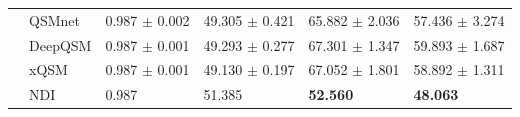 \documentclass[sn-vancouver,Numbered]{sn-jnl}%
\begin{document}
\begin{table}[htbp]
{\begin{tabular}{clllll}
& QSMnet                
&0.987 $\pm$ 0.002  
&49.305 $\pm$ 0.421
&65.882 $\pm$ 2.036
&57.436 $\pm$ 3.274\\  

& DeepQSM               
&0.987 $\pm$ 0.001	            
&49.293 $\pm$ 0.277	                
&67.301 $\pm$ 1.347	              
&59.893 $\pm$ 1.687\\ 

& xQSM               
&0.987 $\pm$ 0.001	     
&49.130 $\pm$ 0.197
&67.052 $\pm$ 1.801
&58.892 $\pm$ 1.311\\ 

& NDI                              
&0.987	     
&51.385
&\textbf{52.560}
&\textbf{48.063}\\ 
\hline


\end{tabular} }
\label{tab:other_data}
\end{table}
\end{document}
